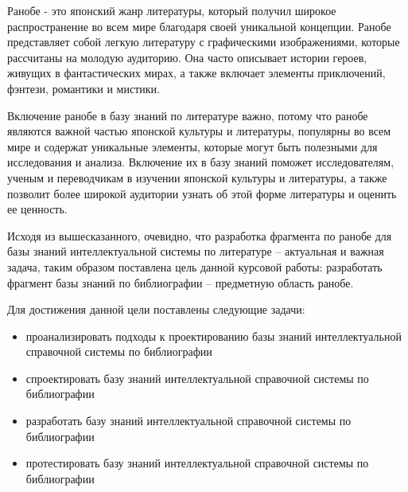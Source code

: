 
Ранобе - это японский жанр литературы, который получил широкое распространение во всем мире благодаря своей уникальной концепции. Ранобе представляет собой легкую литературу с графическими изображениями, которые рассчитаны на молодую аудиторию. Она часто описывает истории героев, живущих в фантастических мирах, а также включает элементы приключений, фэнтези, романтики и мистики.

Включение ранобе в базу знаний по литературе важно, потому что ранобе являются важной частью японской культуры и литературы, популярны во всем мире и содержат уникальные элементы, которые могут быть полезными для исследования и анализа. Включение их в базу знаний поможет исследователям, ученым и переводчикам в изучении японской культуры и литературы, а также позволит более широкой аудитории узнать об этой форме литературы и оценить ее ценность.

Исходя из вышесказанного, очевидно, что разработка фрагмента по ранобе для базы знаний интеллектуальной системы по литературе -- актуальная и важная задача, таким образом поставлена цель данной курсовой работы: разработать фрагмент базы знаний по библиографии -- предметную область ранобе.

Для достижения данной цели поставлены следующие задачи:
\begin{itemize}
    \item проанализировать подходы к проектированию базы знаний интеллектуальной справочной системы по библиографии
    \item спроектировать базу знаний интеллектуальной справочной системы по библиографии
    \item разработать базу знаний интеллектуальной справочной системы по библиографии
    \item протестировать базу знаний интеллектуальной справочной системы по библиографии
\end{itemize}
